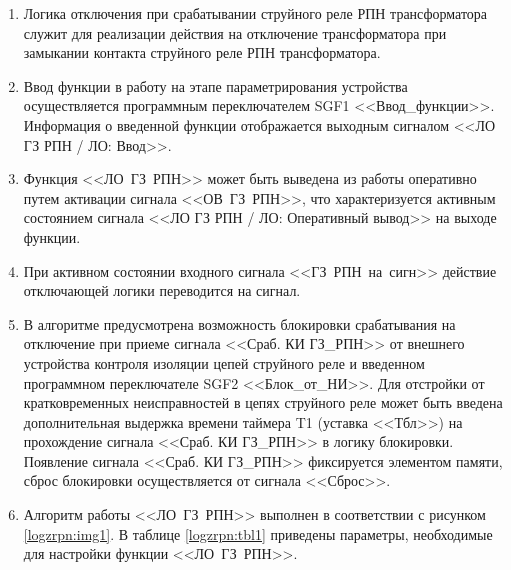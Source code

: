 \documentclass[a4paper, 12pt,table, hidelinks, DIV=calc]{extarticle} %
\begin{document}
\FloatBarrier %
\color{black}

\begin{enumerate}[label=\arabic{section}.\arabic{subsection}.\arabic*, labelsep=4pt, leftmargin=0pt, itemindent=57pt]

\item
Логика отключения при срабатывании струйного реле РПН трансформатора служит для реализации действия на отключение трансформатора при замыкании контакта струйного реле РПН трансформатора. 
\item
Ввод функции в работу на этапе параметрирования устройства осуществляется программным переключателем SGF1 <<Ввод\_функции>>. Информация о введенной функции отображается выходным сигналом <<ЛО ГЗ РПН / ЛО: Ввод>>.
\item
Функция <<ЛО~ГЗ~РПН>> может быть выведена из работы оперативно путем активации сигнала <<ОВ~ГЗ~РПН>>, что характеризуется активным состоянием сигнала <<ЛО ГЗ РПН / ЛО: Оперативный вывод>> на выходе функции. 
\item
При активном состоянии входного сигнала <<ГЗ~РПН~на~сигн>> действие отключающей логики переводится на сигнал.
\item
В алгоритме предусмотрена возможность блокировки срабатывания на отключение при приеме сигнала <<Сраб. КИ ГЗ\_РПН>> от внешнего устройства контроля изоляции цепей струйного реле и введенном программном переключателе SGF2 <<Блок\_от\_НИ>>. Для отстройки от кратковременных неисправностей в цепях струйного реле может быть введена дополнительная выдержка времени таймера T1 (уставка <<Тбл>>) на прохождение сигнала <<Сраб. КИ ГЗ\_РПН>> в логику блокировки. 
Появление сигнала <<Сраб. КИ ГЗ\_РПН>> фиксируется элементом памяти, сброс блокировки осуществляется от сигнала <<Сброс>>.
\item
Алгоритм работы <<ЛО~ГЗ~РПН>> выполнен в соответствии с рисунком \ref{logzrpn:img1}. В таблице \ref{logzrpn:tbl1} приведены параметры, необходимые для настройки функции <<ЛО~ГЗ~РПН>>.


\end{enumerate}
\end{document}
